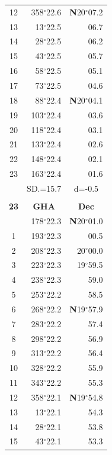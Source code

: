 \documentclass[10pt, a4paper]{report}
\begin{document}
\begin{scriptsize}
\begin{tabular*}{0.2\textwidth}[t]{@{\extracolsep{\fill}}|c|rr|}
12 & 358$^\circ$22.6 & \textbf{N}20$^\circ$07.2\\
13 & 13$^\circ$22.5 & 06.7\\
14 & 28$^\circ$22.5 & 06.2\\
15 & 43$^\circ$22.5 & \raisebox{0.24ex}{\boldmath$\cdot$~\boldmath$\cdot$~~}05.7\\
16 & 58$^\circ$22.5 & 05.1\\
17 & 73$^\circ$22.5 & 04.6\\[2Pt]
18 & 88$^\circ$22.4 & \textbf{N}20$^\circ$04.1\\
19 & 103$^\circ$22.4 & 03.6\\
20 & 118$^\circ$22.4 & 03.1\\
21 & 133$^\circ$22.4 & \raisebox{0.24ex}{\boldmath$\cdot$~\boldmath$\cdot$~~}02.6\\
22 & 148$^\circ$22.4 & 02.1\\
23 & 163$^\circ$22.4 & 01.6\\
\hline
\rule{0pt}{2.4ex} & \multicolumn{1}{c}{SD.=15.7} & \multicolumn{1}{c|}{d=-0.5}\\
\hline
\multicolumn{1}{c}{}\\[-0.5ex]\hline
\multicolumn{1}{|c|}{\rule{0pt}{2.6ex}\textbf{23}} & \multicolumn{1}{c}{\textbf{GHA}} & \multicolumn{1}{c|}{\textbf{Dec}}\\
\hline\rule{0pt}{2.6ex}\noindent
0 & 178$^\circ$22.3 & \textbf{N}20$^\circ$01.0\\
1 & 193$^\circ$22.3 & 00.5\\
2 & 208$^\circ$22.3 & 20$^\circ$00.0\\
3 & 223$^\circ$22.3 & 19$^\circ$59.5\\
4 & 238$^\circ$22.3 & 59.0\\
5 & 253$^\circ$22.2 & 58.5\\[2Pt]
6 & 268$^\circ$22.2 & \textbf{N}19$^\circ$57.9\\
7 & 283$^\circ$22.2 & 57.4\\
8 & 298$^\circ$22.2 & 56.9\\
9 & 313$^\circ$22.2 & \raisebox{0.24ex}{\boldmath$\cdot$~\boldmath$\cdot$~~}56.4\\
10 & 328$^\circ$22.2 & 55.9\\
11 & 343$^\circ$22.2 & 55.3\\[2Pt]
12 & 358$^\circ$22.1 & \textbf{N}19$^\circ$54.8\\
13 & 13$^\circ$22.1 & 54.3\\
14 & 28$^\circ$22.1 & 53.8\\
15 & 43$^\circ$22.1 & \raisebox{0.24ex}{\boldmath$\cdot$~\boldmath$\cdot$~~}53.3\\

\end{tabular*}
\end{scriptsize}
\end{document}
